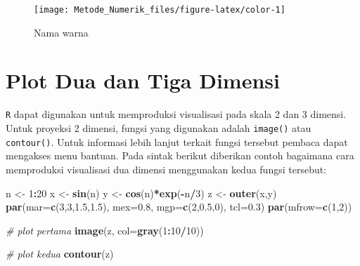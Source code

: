 \documentclass[]{book}
\newenvironment{Shaded}{\begin{snugshade}}{\end{snugshade}}
\newcommand{\CommentTok}[1]{\textcolor[rgb]{0.56,0.35,0.01}{\textit{#1}}}
\newcommand{\DataTypeTok}[1]{\textcolor[rgb]{0.13,0.29,0.53}{#1}}
\newcommand{\DecValTok}[1]{\textcolor[rgb]{0.00,0.00,0.81}{#1}}
\newcommand{\FloatTok}[1]{\textcolor[rgb]{0.00,0.00,0.81}{#1}}
\newcommand{\KeywordTok}[1]{\textcolor[rgb]{0.13,0.29,0.53}{\textbf{#1}}}
\newcommand{\NormalTok}[1]{#1}
\newcommand{\OperatorTok}[1]{\textcolor[rgb]{0.81,0.36,0.00}{\textbf{#1}}}
\newcommand{\StringTok}[1]{\textcolor[rgb]{0.31,0.60,0.02}{#1}}
\theoremstyle{definition}
\theoremstyle{definition}
\theoremstyle{definition}
\theoremstyle{remark}
\begin{document}
\begin{figure}

{\centering \texttt{[image: Metode\_Numerik\_files/figure-latex/color-1]} 

}

\caption{Nama warna}\label{fig:color}
\end{figure}

\hypertarget{plot-dua-dan-tiga-dimensi}{%
\section{Plot Dua dan Tiga Dimensi}\label{plot-dua-dan-tiga-dimensi}}

\texttt{R} dapat digunakan untuk memproduksi visualisasi pada skala 2 dan 3 dimensi. Untuk proyeksi 2 dimensi, fungsi yang digunakan adalah \texttt{image()} atau \texttt{contour()}. Untuk informasi lebih lanjut terkait fungsi tersebut pembaca dapat mengakses menu bantuan. Pada sintak berikut diberikan contoh bagaimana cara memproduksi visualisasi dua dimensi menggunakan kedua fungsi tersebut:

\begin{Shaded}
\begin{Highlighting}[]
\NormalTok{n <-}\StringTok{ }\DecValTok{1}\OperatorTok{:}\DecValTok{20}
\NormalTok{x <-}\StringTok{ }\KeywordTok{sin}\NormalTok{(n)}
\NormalTok{y <-}\StringTok{ }\KeywordTok{cos}\NormalTok{(n)}\OperatorTok{*}\KeywordTok{exp}\NormalTok{(}\OperatorTok{-}\NormalTok{n}\OperatorTok{/}\DecValTok{3}\NormalTok{)}
\NormalTok{z <-}\StringTok{ }\KeywordTok{outer}\NormalTok{(x,y)}
\KeywordTok{par}\NormalTok{(}\DataTypeTok{mar=}\KeywordTok{c}\NormalTok{(}\DecValTok{3}\NormalTok{,}\DecValTok{3}\NormalTok{,}\FloatTok{1.5}\NormalTok{,}\FloatTok{1.5}\NormalTok{), }\DataTypeTok{mex=}\FloatTok{0.8}\NormalTok{, }\DataTypeTok{mgp=}\KeywordTok{c}\NormalTok{(}\DecValTok{2}\NormalTok{,}\FloatTok{0.5}\NormalTok{,}\DecValTok{0}\NormalTok{), }\DataTypeTok{tcl=}\FloatTok{0.3}\NormalTok{)}
\KeywordTok{par}\NormalTok{(}\DataTypeTok{mfrow=}\KeywordTok{c}\NormalTok{(}\DecValTok{1}\NormalTok{,}\DecValTok{2}\NormalTok{))}

\CommentTok{# plot pertama}
\KeywordTok{image}\NormalTok{(z, }\DataTypeTok{col=}\KeywordTok{gray}\NormalTok{(}\DecValTok{1}\OperatorTok{:}\DecValTok{10}\OperatorTok{/}\DecValTok{10}\NormalTok{))}

\CommentTok{# plot kedua}
\KeywordTok{contour}\NormalTok{(z)}
\end{Highlighting}
\end{Shaded}
\end{document}
